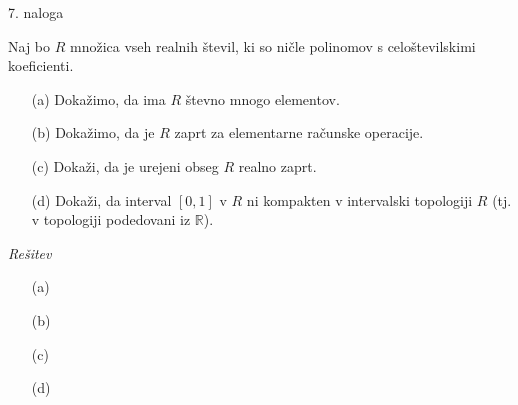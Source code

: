 \documentclass[a4paper, 12pt]{article}
\newcommand{\R}{\mathbb{R}}
\begin{document}
\begin{flushleft}
7. naloga
\end{flushleft}
Naj bo $R$ množica vseh realnih števil, ki so ničle polinomov s celoštevilskimi koeficienti.
\begin{enumerate}
\item[(a)] Dokažimo, da ima $R$ števno mnogo elementov.
\item[(b)] Dokažimo, da je $R$ zaprt za elementarne računske operacije.
\item[(c)] Dokaži, da je urejeni obseg $R$ realno zaprt.
\item[(d)] Dokaži, da interval $[0,1]$ v $R$ ni kompakten v intervalski topologiji $R$ (tj. v topologiji podedovani iz $\R$).
\end{enumerate}
\emph{Rešitev}
\begin{enumerate}
\item[(a)]
\item[(b)]
\item[(c)]
\item[(d)]
\end{enumerate}
\end{document}
